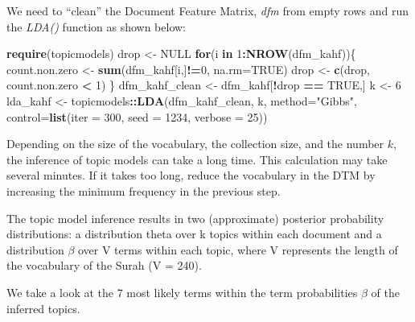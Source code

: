 \documentclass[
]{article}
\newenvironment{Shaded}{\begin{snugshade}}{\end{snugshade}}
\newcommand{\AttributeTok}[1]{\textcolor[rgb]{0.13,0.29,0.53}{#1}}
\newcommand{\ConstantTok}[1]{\textcolor[rgb]{0.56,0.35,0.01}{#1}}
\newcommand{\ControlFlowTok}[1]{\textcolor[rgb]{0.13,0.29,0.53}{\textbf{#1}}}
\newcommand{\DecValTok}[1]{\textcolor[rgb]{0.00,0.00,0.81}{#1}}
\newcommand{\FunctionTok}[1]{\textcolor[rgb]{0.13,0.29,0.53}{\textbf{#1}}}
\newcommand{\NormalTok}[1]{#1}
\newcommand{\OtherTok}[1]{\textcolor[rgb]{0.56,0.35,0.01}{#1}}
\newcommand{\SpecialCharTok}[1]{\textcolor[rgb]{0.81,0.36,0.00}{\textbf{#1}}}
\newcommand{\StringTok}[1]{\textcolor[rgb]{0.31,0.60,0.02}{#1}}
\begin{document}
We need to ``clean'' the Document Feature Matrix, \emph{dfm} from empty rows and run the \emph{LDA()} function as shown below:

\footnotesize

\begin{Shaded}
\begin{Highlighting}[]
\FunctionTok{require}\NormalTok{(topicmodels)}
\NormalTok{drop }\OtherTok{\textless{}{-}} \ConstantTok{NULL}
\ControlFlowTok{for}\NormalTok{(i }\ControlFlowTok{in} \DecValTok{1}\SpecialCharTok{:}\FunctionTok{NROW}\NormalTok{(dfm\_kahf))\{}
\NormalTok{     count.non.zero }\OtherTok{\textless{}{-}} \FunctionTok{sum}\NormalTok{(dfm\_kahf[i,]}\SpecialCharTok{!=}\DecValTok{0}\NormalTok{, }\AttributeTok{na.rm=}\ConstantTok{TRUE}\NormalTok{)}
\NormalTok{     drop }\OtherTok{\textless{}{-}} \FunctionTok{c}\NormalTok{(drop, count.non.zero }\SpecialCharTok{\textless{}} \DecValTok{1}\NormalTok{)}
\NormalTok{   \}}
\NormalTok{dfm\_kahf\_clean }\OtherTok{\textless{}{-}}\NormalTok{ dfm\_kahf[}\SpecialCharTok{!}\NormalTok{drop }\SpecialCharTok{==} \ConstantTok{TRUE}\NormalTok{,]}
\NormalTok{k }\OtherTok{\textless{}{-}} \DecValTok{6}
\NormalTok{lda\_kahf }\OtherTok{\textless{}{-}}\NormalTok{ topicmodels}\SpecialCharTok{::}\FunctionTok{LDA}\NormalTok{(dfm\_kahf\_clean, k, }\AttributeTok{method=}\StringTok{"Gibbs"}\NormalTok{, }
            \AttributeTok{control=}\FunctionTok{list}\NormalTok{(}\AttributeTok{iter =} \DecValTok{300}\NormalTok{, }\AttributeTok{seed =} \DecValTok{1234}\NormalTok{, }\AttributeTok{verbose =} \DecValTok{25}\NormalTok{))}
\end{Highlighting}
\end{Shaded}

\normalsize

Depending on the size of the vocabulary, the collection size, and the number \(k\), the inference of topic models can take a long time. This calculation may take several minutes. If it takes too long, reduce the vocabulary in the DTM by increasing the minimum frequency in the previous step.

The topic model inference results in two (approximate) posterior probability distributions: a distribution theta over k topics within each document and a distribution \(\beta\) over V terms within each topic, where V represents the length of the vocabulary of the Surah (V = 240).

We take a look at the 7 most likely terms within the term probabilities \(\beta\) of the inferred topics.
\end{document}
